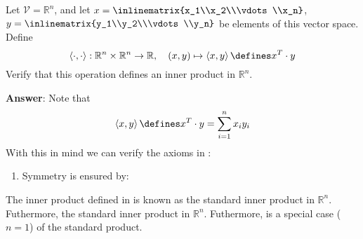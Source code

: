 \begin{exm}\label{exm-inner-product:2}
	Let $\mathcal{V}=\mathbb{R}^n$, and let $x=\inlinematrix{x_1\\x_2\\\vdots\\x_n}$,
	$y=\inlinematrix{y_1\\y_2\\\vdots\\y_n}$ be elements of this vector space. Define
	\begin{equation}
		\left<\cdot,\cdot\right>:\mathbb{R}^n\times\mathbb{R}^n\to\mathbb{R},
		\quad(x,y)\mapsto\left<x,y\right>\defines x^T \cdot y
	\end{equation}
	Verify that this operation defines an inner product in $\mathbb{R}^n$.
	\begin{flushleft}
		\textbf{Answer}: Note that
		\begin{equation*}
			\left<x,y\right>\defines x^T \cdot y = \sum_{i=1}^n x_iy_i
		\end{equation*}
		With this in mind we can verify the axioms in :
		\begin{enumerate}
			\item Symmetry is ensured by:
		\end{enumerate}
	\end{flushleft}
\end{exm}

\begin{rem}
	The inner product defined in  is known as
	the standard inner product in $\mathbb{R}^n$. Futhermore,
	the standard inner product in $\mathbb{R}^n$. Futhermore, 
	is a special case ($n=1$) of the standard product.
\end{rem}

